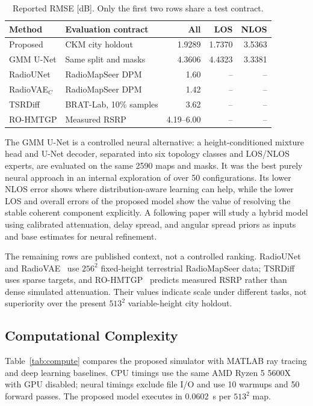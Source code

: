 \documentclass[10pt,conference,letterpaper]{IEEEtran}
\begin{document}
\begin{table}[t]
\centering
\caption{Reported RMSE [dB]. Only the first two rows share a test contract.}
\label{tab:accuracy-context}
\scriptsize
\setlength{\tabcolsep}{1.5pt}
\begin{tabular}{@{}>{\raggedright\arraybackslash}p{1.55cm}>{\raggedright\arraybackslash}p{1.95cm}rrr@{}}
\toprule
Method & Evaluation contract & All & LOS & NLOS \\
\midrule
Proposed & CKM city holdout & 1.9289 & 1.7370 & 3.5363 \\
GMM U-Net & Same split and masks & 4.3606 & 4.4323 & 3.3381 \\
RadioUNet & RadioMapSeer DPM & 1.60 & -- & -- \\
RadioVAE$_C$ & RadioMapSeer DPM & 1.42 & -- & -- \\
TSRDiff & BRAT-Lab, 10\% samples & 3.62 & -- & -- \\
RO-HMTGP & Measured RSRP & 4.19--6.00 & -- & -- \\
\bottomrule
\end{tabular}
\end{table}

The GMM U-Net is a controlled neural alternative: a height-conditioned mixture
head and U-Net decoder, separated into six topology classes and LOS/NLOS
experts, are evaluated on the same 2590 maps and masks. It was the best purely
neural approach in an internal exploration of over 50 configurations. Its
lower NLOS error shows where distribution-aware learning can help, while the
lower LOS and overall errors of the proposed model show the value of resolving
the stable coherent component explicitly. A following paper will study a
hybrid model using calibrated attenuation, delay spread, and angular spread
priors as inputs and base estimates for neural refinement.

The remaining rows are published context, not a controlled ranking. RadioUNet
and RadioVAE~\cite{radiounet2020,radiovae2025} use $256^2$ fixed-height
terrestrial RadioMapSeer data; TSRDiff~\cite{tsrdiff2025} uses sparse targets,
and RO-HMTGP~\cite{rohmtgp2025} predicts measured RSRP rather than dense
simulated attenuation. Their values indicate scale under different tasks, not
superiority over the present $513^2$ variable-height city holdout.

\subsection{Computational Complexity}
Table~\ref{tab:compute} compares the proposed simulator with MATLAB ray tracing
and deep learning baselines. CPU timings use the same AMD Ryzen 5 5600X with GPU
disabled; neural timings exclude file I/O and use 10 warmups and 50 forward
passes. The proposed model executes in \SI{0.0602}{s} per $513^2$ map.
\end{document}
